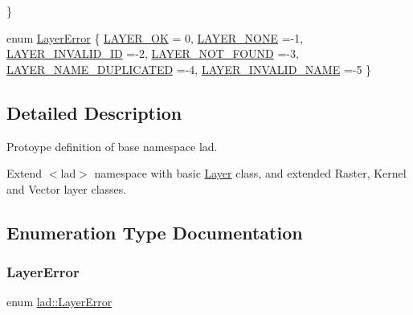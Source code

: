 \begin{DoxyCompactItemize}
 \}
\item 
enum \hyperlink{namespacelad_ab6fa4f89aae36d4017d361f561c23fb2}{Layer\+Error} \{ \newline
\hyperlink{namespacelad_ab6fa4f89aae36d4017d361f561c23fb2aae8bce1c231104b2c1253532faab68ce}{L\+A\+Y\+E\+R\+\_\+\+OK} = 0, 
\hyperlink{namespacelad_ab6fa4f89aae36d4017d361f561c23fb2a2db87044cde37fae0b1eef211f82b30f}{L\+A\+Y\+E\+R\+\_\+\+N\+O\+NE} =-\/1, 
\hyperlink{namespacelad_ab6fa4f89aae36d4017d361f561c23fb2a0b8891f1129b3275b040121dbc7895ae}{L\+A\+Y\+E\+R\+\_\+\+I\+N\+V\+A\+L\+I\+D\+\_\+\+ID} =-\/2, 
\hyperlink{namespacelad_ab6fa4f89aae36d4017d361f561c23fb2a006a13c7043f677515169b82380d4576}{L\+A\+Y\+E\+R\+\_\+\+N\+O\+T\+\_\+\+F\+O\+U\+ND} =-\/3, 
\newline
\hyperlink{namespacelad_ab6fa4f89aae36d4017d361f561c23fb2af9f25731045d7573cb53db357abf8853}{L\+A\+Y\+E\+R\+\_\+\+N\+A\+M\+E\+\_\+\+D\+U\+P\+L\+I\+C\+A\+T\+ED} =-\/4, 
\hyperlink{namespacelad_ab6fa4f89aae36d4017d361f561c23fb2add2291b39f8d85f19fb6febbc945dc1b}{L\+A\+Y\+E\+R\+\_\+\+I\+N\+V\+A\+L\+I\+D\+\_\+\+N\+A\+ME} =-\/5
 \}
\end{DoxyCompactItemize}


\subsection{Detailed Description}
Protoype definition of base namespace lad. 

Extend $<$lad$>$ namespace with basic \hyperlink{classlad_1_1_layer}{Layer} class, and extended Raster, Kernel and Vector layer classes. 

\subsection{Enumeration Type Documentation}
\mbox{\label{namespacelad_ab6fa4f89aae36d4017d361f561c23fb2}} 
\subsubsection{\texorpdfstring{Layer\+Error}{LayerError}}
{\footnotesize\ttfamily enum \hyperlink{namespacelad_ab6fa4f89aae36d4017d361f561c23fb2}{lad\+::\+Layer\+Error}}

